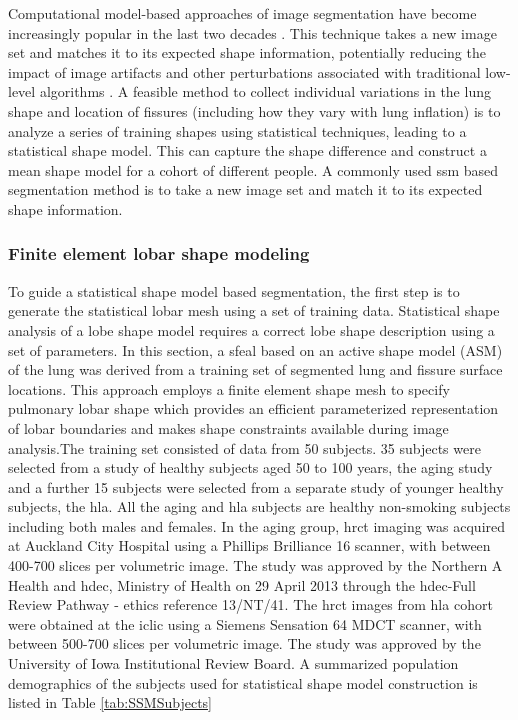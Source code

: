 Computational model-based approaches of image segmentation have become increasingly popular in the last two decades \citep{taylor1995medical,kelemen1999elastic,tsai2003shape,okada2008automated}. This technique takes a new image set and matches it to its expected shape information, potentially reducing the impact of image artifacts and other perturbations associated with traditional low-level algorithms \citep{ecabert2008automatic,zhang2013development}. A feasible method to collect individual variations in the lung shape and location of fissures (including how they vary with lung inflation) is to analyze a series of training shapes using statistical techniques, leading to a statistical shape model. This can capture the shape difference and construct a mean shape model for a cohort of different people. A commonly used \gls{ssm} based segmentation method is to take a new image set and match it to its expected shape information. 

\subsubsection{Finite element lobar shape modeling} 

To guide a statistical shape model based segmentation, the first step is to generate the statistical lobar mesh using a set of training data. Statistical shape analysis of a lobe shape model requires a correct lobe shape description using a set of parameters. In this section, a \gls{sfeal} based on an active shape model (ASM) \citep{cootes1995active} of the lung was derived from a training set of segmented lung and fissure surface locations. This approach employs a finite element shape mesh to specify pulmonary lobar shape which provides an efficient parameterized representation of lobar boundaries and makes shape constraints available during image analysis.The training set consisted of data from 50 subjects. 35 subjects were selected from a study of healthy subjects aged 50 to 100 years, the \gls{aging} study and a further 15 subjects were selected from a separate study of younger healthy subjects, the \gls{hla}. All the \gls{aging} and \gls{hla} subjects are healthy non-smoking subjects including both males and females. In the \gls{aging} group, \gls{hrct} imaging was acquired at Auckland City Hospital using a Phillips Brilliance 16 scanner, with between 400-700 slices per volumetric image. The study was approved by the Northern A Health and \gls{hdec}, Ministry of Health on 29 April 2013 through the \gls{hdec}-Full Review Pathway - ethics reference 13/NT/41. The \gls{hrct} images from \gls{hla} cohort were obtained at the \gls{iclic} using a Siemens Sensation 64 MDCT scanner, with between 500-700 slices per volumetric image. The study was approved by the University of Iowa Institutional Review Board. A summarized population demographics of the subjects used for statistical shape model construction is listed in Table \ref{tab:SSMSubjects}

